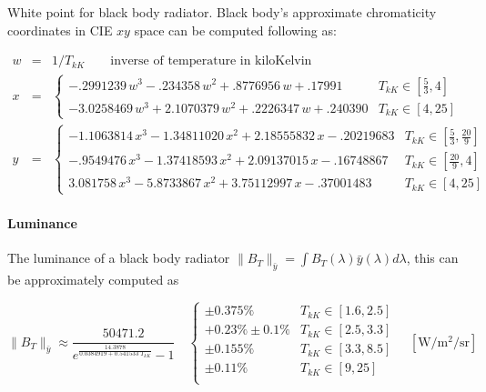 White point for black body radiator. Black body's approximate chromaticity
coordinates in CIE $xy$ space can be computed following \cite{kang02} as:

\begin{equation}
\begin{array}{rcll}
w & = & 1/T_{kK} \qquad \text{inverse of temperature in kiloKelvin} & \\
x & = & \begin{cases}
     - .2991239\,w^3 -  .234358 \,w^2  +  .8776956\,w  + .17991  & T_{kK} \in [\frac{5}{3}, 4] \\
     -3.0258469\,w^3 + 2.1070379\,w^2  +  .2226347\,w  + .240390 & T_{kK} \in [4, 25]
    \end{cases} \\
y & = & \begin{cases}
     -1.1063814\,x^3 - 1.34811020\,x^2 + 2.18555832\,x - .20219683 & T_{kK} \in [\frac{5}{3}, \frac{20}{9}] \\
     - .9549476\,x^3 - 1.37418593\,x^2 + 2.09137015\,x - .16748867 & T_{kK} \in [\frac{20}{9}, 4] \\
      3.081758 \,x^3 - 5.8733867 \,x^2 + 3.75112997\,x - .37001483 & T_{kK} \in [4, 25]
      \end{cases}
\end{array}
\end{equation}

\paragraph{Luminance}

The luminance of a black body radiator $\|B_T\|_{\bar y} = \int B_T(\lambda)\bar y(\lambda) d\lambda$,
this can be approximately computed as

\begin{equation}
\|B_T\|_{\bar y} \approx \frac{50471.2}{e^{\frac{14.3878}{0.0384919 +
0.541533\; T_{kK}}}-1}
\quad \left\{\begin{array}{cl}
\pm 0.375\% & T_{kK} \in [1.6, 2.5] \\
+0.23\% \pm 0.1\% & T_{kK} \in [2.5, 3.3] \\
\pm 0.155\% & T_{kK} \in [3.3, 8.5] \\
\pm 0.11\%  & T_{kK} \in [9, 25] \\
\end{array}\right.
\quad \left[\unit{\watt\per\square\meter\per\steradian}\right]
\end{equation}



